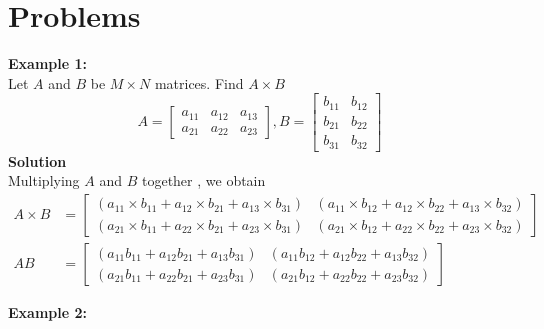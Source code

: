 \documentclass[12pt]{report}
\begin{document}
	\section{Problems}
	\textbf{Example 1:}\\
	Let $A$ and $B$ be $M \times N$ matrices. Find $A\times B$
	$$A= \begin{bmatrix}
		a_{11} & a_{12} & a_{13}\\
		a_{21} & a_{22} & a_{23}
	\end{bmatrix}, B = \begin{bmatrix}
		b_{11} & b_{12}\\
		b_{21} & b_{22}\\
		b_{31} & b_{32}
	\end{bmatrix} 
	$$
	\textbf{Solution}\\
	Multiplying $A$ and $B$ together , we obtain
	\begin{align*}
		A \times B &= \begin{bmatrix}
			(a_{11}\times b_{11} + a_{12} \times b_{21} + a_{13} \times b_{31})  & (a_{11} \times b_{12}+a_{12}\times b_{22} + a_{13}\times b_{32})\\
			(a_{21}\times b_{11} + a_{22} \times b_{21} + a_{23} \times b_{31})  & (a_{21} \times b_{12}+a_{22}\times b_{22} + a_{23}\times b_{32})
		\end{bmatrix}\\[0.6cm]
		AB &= \begin{bmatrix}
			(a_{11} b_{11} + a_{12}  b_{21} + a_{13}  b_{31})  & (a_{11}  b_{12}+a_{12} b_{22} + a_{13} b_{32})\\
			(a_{21} b_{11} + a_{22}  b_{21} + a_{23}  b_{31})  & (a_{21}  b_{12}+a_{22} b_{22} + a_{23} b_{32})
		\end{bmatrix}
	\end{align*}
	
	
	
	
	
	
	
	\textbf{Example 2:}\\
	
\end{document}
